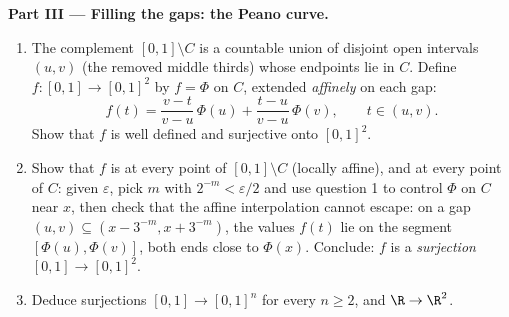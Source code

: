 \begin{problem}
\medskip
\noindent\textbf{Part III --- Filling the gaps: the Peano
curve.}
\begin{enumerate}[resume]
  \item The complement $[0,1] \setminus C$ is a countable union
        of disjoint open intervals $(u, v)$ (the removed middle
        thirds) whose endpoints lie in $C$. Define $f \colon
        [0,1] \to [0,1]^2$ by $f = \Phi$ on $C$, extended
        \emph{affinely} on each gap:
        \[
        f(t) = \frac{v - t}{v - u}\,\Phi(u) +
        \frac{t - u}{v - u}\,\Phi(v),
        \qquad t \in (u, v).
        \]
        Show that $f$ is well defined and surjective onto
        $[0,1]^2$.
  \item Show that $f$ is  at every point of $[0,1]
        \setminus C$ (locally affine), and at every point of
        $C$: given $\varepsilon$, pick $m$ with $2^{-m} <
        \varepsilon/2$ and use question 1 to control $\Phi$ on
        $C$ near $x$, then check that the affine
        interpolation cannot escape: on a gap $(u,v) \subseteq
        (x - 3^{-m}, x + 3^{-m})$, the values $f(t)$ lie on the
        segment $[\Phi(u), \Phi(v)]$, both ends close to
        $\Phi(x)$. Conclude: $f$ is a \emph{
        surjection} $[0,1] \to [0,1]^2$.
  \item Deduce  surjections $[0,1] \to [0,1]^n$ for
        every $n \geq 2$, and $\R \to \R^2$.
\end{enumerate}


\end{problem}
